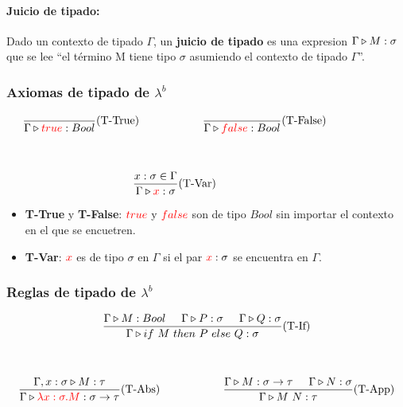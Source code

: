 \paragraph{Juicio de tipado:} Dado un contexto de tipado $\Gamma$, un \textbf{juicio de tipado} es una expresion $\Gamma\triangleright M : \sigma$ que se lee ``el término M tiene tipo $\sigma$ asumiendo el contexto de tipado $\Gamma$''. 

\subsubsection{Axiomas de tipado de \texorpdfstring{$\lambda^b$}{lambda b}}

\begin{equation*}
	\begin{gathered}
		\frac{}{\judgeType{\Gamma}{\lambdaValue{true}}{Bool}}(\text{T-True}) \hspace*{2cm} \frac{}{\judgeType{\Gamma}{\lambdaValue{false}}{Bool}}(\text{T-False})\hspace*{2cm} \\
		\vspace*{5mm} \\
		\frac{x:\sigma\in\Gamma}{\judgeType{\Gamma}{\lambdaValue{x}}{\sigma}}(\text{T-Var})\hspace*{2cm}
	\end{gathered}
\end{equation*}

\vspace*{5mm}

\begin{itemize}
	\item \textbf{T-True} y \textbf{T-False}: $\color{red}true\color{black}$ y $\color{red}false\color{black}$ son de tipo $Bool$ sin importar el contexto en el que se encuetren.
	\item \textbf{T-Var}: $\color{red}x\color{black}$ es de tipo $\sigma$ en $\Gamma$ si el par $\color{red}x\color{black}:\sigma$ se encuentra en $\Gamma$.
\end{itemize}
\subsubsection{Reglas de tipado de \texorpdfstring{$\lambda^b$}{lambda b}}
\begin{equation*}
	\begin{gathered}
		\frac{\judgeType{\Gamma}{M}{Bool}\hspace*{5mm}\judgeType{\Gamma}{P}{\sigma}\hspace*{5mm}\judgeType{\Gamma}{Q}{\sigma}}{\judgeType{\Gamma}{\lambdaIf{M}{P}{Q}}{\sigma}}(\text{T-If}) \\
		\vspace*{5mm} \\
		\frac {\judgeType{\Gamma,x:\sigma}{M}{\tau}}
		{\judgeType{\Gamma}{\lambdaValue{\lambdaAbs{x}{\sigma}{M}}}{\sigma\to\tau}}(\text{T-Abs})\hspace*{2cm}
		\frac{\judgeType{\Gamma}{M}{\sigma\to\tau}\hspace*{5mm}\judgeType{\Gamma}{N}{\sigma}}{\judgeType{\Gamma}{\lambdaApp{M}{N}}{\tau}}(\text{T-App})
	\end{gathered}
\end{equation*}

